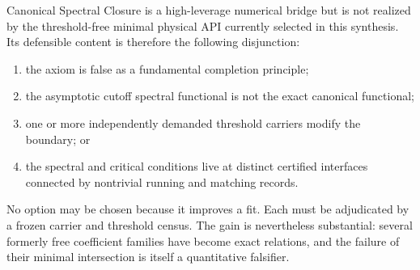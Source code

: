 \begin{proposition}
Canonical Spectral Closure is a high-leverage numerical bridge but is not realized by the
threshold-free minimal physical API currently selected in this synthesis.  Its defensible
content is therefore the following disjunction:
\begin{enumerate}[label=\textup{(\roman*)},leftmargin=2.2em]
\item the axiom is false as a fundamental completion principle;
\item the asymptotic cutoff spectral functional is not the exact canonical functional;
\item one or more independently demanded threshold carriers modify the boundary; or
\item the spectral and critical conditions live at distinct certified interfaces connected by
      nontrivial running and matching records.
\end{enumerate}
No option may be chosen because it improves a fit.  Each must be adjudicated by a frozen
carrier and threshold census.  The gain is nevertheless substantial: several formerly free
coefficient families have become exact relations, and the failure of their minimal
intersection is itself a quantitative falsifier.
\end{proposition}
